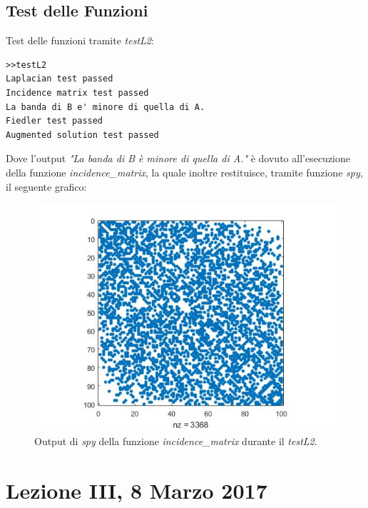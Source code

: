 \documentclass[11pt,a4paper,twoside,openright,titlepage,
                           headinclude,footinclude,BCOR5mm,
                           numbers=noenddot,cleardoublepage=empty,
                           tablecaptionabove]{scrbook}
\begin{document}
\section{Test delle Funzioni}
Test delle funzioni tramite \emph{testL2}:
\begin{lstlisting}[frame=lines]
>>testL2
Laplacian test passed
Incidence matrix test passed
La banda di B e' minore di quella di A.
Fiedler test passed
Augmented solution test passed
\end{lstlisting}
Dove l'output \emph{"La banda di B è minore di quella di A."} è dovuto all'esecuzione della funzione \emph{incidence\_matrix}, la quale inoltre restituisce, tramite funzione \emph{spy}, il seguente grafico:
\begin{figure}[h]
\begin{center}
\includegraphics[width=\textwidth]{figs/testL2fig.jpg}
\caption{Output di \emph{spy} della funzione \emph{incidence\_matrix} durante il \emph{testL2}.}
\end{center}
\end{figure}

\chapter{Lezione III, 8 Marzo 2017}
\end{document}
